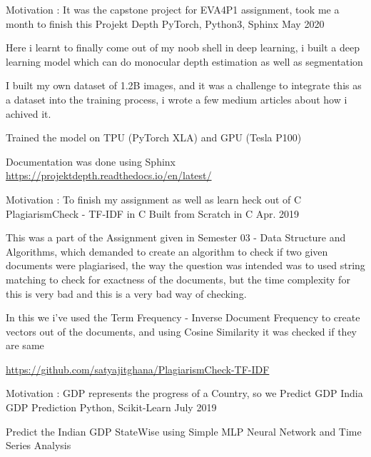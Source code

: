 \begin{cventries}
    \cventry
        {Motivation : It was the capstone project for EVA4P1 assignment, took me a month to finish this}
        {Projekt Depth}
        {PyTorch, Python3, Sphinx}
        {May 2020}
        {
            \begin{cvitems}
                \item {Here i learnt to finally come out of my noob shell in deep learning, i built a
                deep learning model which can do monocular depth estimation as well as segmentation}
                \item {I built my own dataset of 1.2B images, and it was a challenge to integrate this as a dataset
                into the training process, i wrote a few medium articles about how i achived it.}
                \item {Trained the model on TPU (PyTorch XLA) and GPU (Tesla P100)}
                \item {Documentation was done using Sphinx \url{https://projektdepth.readthedocs.io/en/latest/}}
            \end{cvitems}
        }
    \cventry
        {Motivation : To finish my assignment as well as learn heck out of C}
        {PlagiarismCheck - TF-IDF in C}
        {Built from Scratch in C}
        {Apr. 2019}
        {
            \begin{cvitems}
               \item {This was a part of the Assignment given in Semester 03 - Data Structure and Algorithms, which demanded to create an algorithm to check if two given documents were plagiarised, the way the question was intended was to used string matching to check for exactness of the documents, but the time complexity for this is very bad and this is a very bad way of checking.}
               \item {In this we i've used the Term Frequency - Inverse Document Frequency to create vectors out of the documents, and using Cosine Similarity it was checked if they are same} 
               \item {\url{https://github.com/satyajitghana/PlagiarismCheck-TF-IDF}}
            \end{cvitems}
        }
    \cventry
        {Motivation : GDP represents the progress of a Country, so we Predict GDP}
        {India GDP Prediction}
        {Python, Scikit-Learn}
        {July 2019}
        {
            \begin{cvitems}
               \item {Predict the Indian GDP StateWise using Simple MLP Neural Network and Time Series Analysis}

\end{cvitems}}
\end{cventries}

